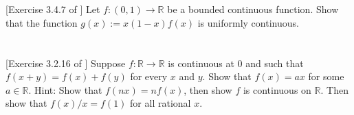 \documentclass[11pt,letterpaper]{article}
\begin{document}
\section{} [Exercise 3.4.7 of \cite{Lebl_23}]
Let $f:(0,1)\to \mathbb{R}$ be a bounded continuous function. Show that the function $g(x):= x(1-x)f(x)$ is uniformly continuous.

\section{} [Exercise 3.2.16 of \cite{Lebl_23}]
Suppose $f:\mathbb{R}\to \mathbb{R}$ is continuous at 0 and such that $f(x+y)=f(x)+f(y)$ for every $x$ and $y$. Show that $f(x)=ax$ for some $a\in\mathbb{R}$. Hint: Show that $f(nx)=nf(x)$, then show $f$ is
continuous on $\mathbb{R}$. Then show that $f(x)/x=f(1)$ for all rational $x$.


\vfill
\printbibliography
\end{document}
